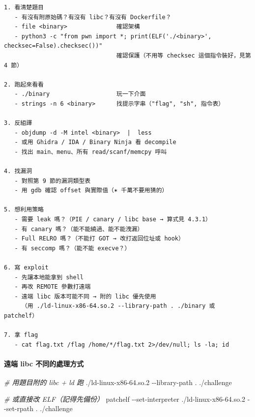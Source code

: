 \documentclass[10pt,a4paper]{article}
\newenvironment{Shaded}{\begin{snugshade}}{\end{snugshade}}
\newcommand{\AttributeTok}[1]{\textcolor[rgb]{0.13,0.29,0.53}{#1}}
\newcommand{\CommentTok}[1]{\textcolor[rgb]{0.56,0.35,0.01}{\textit{#1}}}
\newcommand{\ExtensionTok}[1]{#1}
\newcommand{\NormalTok}[1]{#1}
\renewenvironment{Shaded}{%
  \def\FrameCommand{\fboxsep=3.2pt\colorbox{shadecolor}}%
  \MakeFramed{\advance\hsize-\width\FrameRestore\small}%
}{%
  \endMakeFramed
}
\begin{document}
\begin{Verbatim}[breaklines=true,breakanywhere=true,breakautoindent=false,fontsize=\fontsize{7.0}{9.5}\selectfont]
1. 看清楚題目
   - 有沒有附原始碼？有沒有 libc？有沒有 Dockerfile？
   - file <binary>              確認架構
   - python3 -c "from pwn import *; print(ELF('./<binary>', checksec=False).checksec())"
                                確認保護（不用等 checksec 這個指令裝好，見第 4 節）

2. 跑起來看看
   - ./binary                   玩一下介面
   - strings -n 6 <binary>      找提示字串（"flag", "sh", 指令表）

3. 反組譯
   - objdump -d -M intel <binary>  |  less
   - 或用 Ghidra / IDA / Binary Ninja 看 decompile
   - 找出 main、menu、所有 read/scanf/memcpy 呼叫

4. 找漏洞
   - 對照第 9 節的漏洞類型表
   - 用 gdb 確認 offset 與實際值（✶ 千萬不要用猜的）

5. 想利用策略
   - 需要 leak 嗎？（PIE / canary / libc base → 算式見 4.3.1）
   - 有 canary 嗎？（能不能繞過、能不能洩漏）
   - Full RELRO 嗎？（不能打 GOT → 改打返回位址或 hook）
   - 有 seccomp 嗎？（能不能 execve？）

6. 寫 exploit
   - 先讓本地能拿到 shell
   - 再改 REMOTE 參數打遠端
   - 遠端 libc 版本可能不同 → 附的 libc 優先使用
     （用 ./ld-linux-x86-64.so.2 --library-path . ./binary 或 patchelf）

7. 拿 flag
   - cat flag.txt /flag /home/*/flag.txt 2>/dev/null; ls -la; id
\end{Verbatim}

\paragraph{遠端 libc
不同的處理方式}\label{ux9060ux7aef-libc-ux4e0dux540cux7684ux8655ux7406ux65b9ux5f0f}

\begin{Shaded}
\begin{Highlighting}[]
\CommentTok{\# 用題目附的 libc + ld 跑}
\ExtensionTok{./ld{-}linux{-}x86{-}64.so.2} \AttributeTok{{-}{-}library{-}path}\NormalTok{ . ./challenge}

\CommentTok{\# 或直接改 ELF（記得先備份）}
\ExtensionTok{patchelf} \AttributeTok{{-}{-}set{-}interpreter}\NormalTok{ ./ld{-}linux{-}x86{-}64.so.2 }\AttributeTok{{-}{-}set{-}rpath}\NormalTok{ . ./challenge}
\end{Highlighting}
\end{Shaded}
\end{document}
